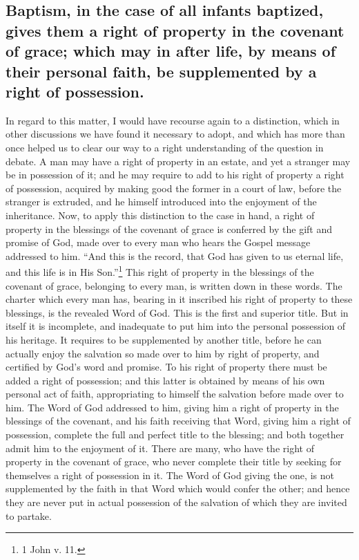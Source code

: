 \documentclass[]{book}
\begin{document}
\hypertarget{baptism-in-the-case-of-all-infants-baptized-gives-them-a-right-of-property-in-the-covenant-of-grace-which-may-in-after-life-by-means-of-their-personal-faith-be-supplemented-by-a-right-of-possession.}{%
\subsection{Baptism, in the case of all infants baptized, gives them a right of property in the covenant of grace; which may in after life, by means of their personal faith, be supplemented by a right of possession.}\label{baptism-in-the-case-of-all-infants-baptized-gives-them-a-right-of-property-in-the-covenant-of-grace-which-may-in-after-life-by-means-of-their-personal-faith-be-supplemented-by-a-right-of-possession.}}

In regard to this matter, I would have recourse again to a distinction, which in other discussions we have found it necessary to adopt, and which has more than once helped us to clear our way to a right understanding of the question in debate. A man may have a right of property in an estate, and yet a stranger may be in possession of it; and he may require to add to his right of property a right of possession, acquired by making good the former in a court of law, before the stranger is extruded, and he himself introduced into the enjoyment of the inheritance. Now, to apply this distinction to the case in hand, a right of property in the blessings of the covenant of grace is conferred by the gift and promise of God, made over to every man who hears the Gospel message addressed to him. ``And this is the record, that God has given to us eternal life, and this life is in His Son.''\footnote{1 John v. 11.} This right of property in the blessings of the covenant of grace, belonging to every man, is written down in these words. The charter which every man has, bearing in it inscribed his right of property to these blessings, is the revealed Word of God. This is the first and superior title. But in itself it is incomplete, and inadequate to put him into the personal possession of his heritage. It requires to be supplemented by another title, before he can actually enjoy the salvation so made over to him by right of property, and certified by God's word and promise. To his right of property there must be added a right of possession; and this latter is obtained by means of his own personal act of faith, appropriating to himself the salvation before made over to him. The Word of God addressed to him, giving him a right of property in the blessings of the covenant, and his faith receiving that Word, giving him a right of possession, complete the full and perfect title to the blessing; and both together admit him to the enjoyment of it. There are many, who have the right of property in the covenant of grace, who never complete their title by seeking for themselves a right of possession in it. The Word of God giving the one, is not supplemented by the faith in that Word which would confer the other; and hence they are never put in actual possession of the salvation of which they are invited to partake.
\end{document}
